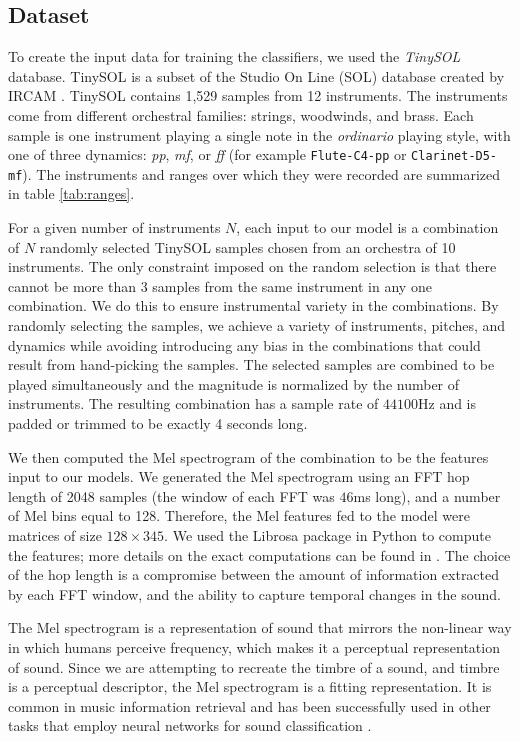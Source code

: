 \documentclass[runningheads,a4paper]{llncs}
\begin{document}
\subsection{Dataset}
\label{sec:dataset}

To create the input data for training the classifiers, we used the \emph{TinySOL} database. TinySOL is a subset of the Studio On Line (SOL) database created by IRCAM \cite{Cella2020b}. TinySOL contains 1,529 samples from 12 instruments. The instruments come from different orchestral families: strings, woodwinds, and brass. Each sample is one instrument playing a single note in the \emph{ordinario} playing style, with one of three dynamics: \textit{pp}, \textit{mf}, or \textit{ff} (for example \texttt{Flute-C4-pp} or \texttt{Clarinet-D5-mf}). The instruments and ranges over which they were recorded are summarized in table \ref{tab:ranges}.

For a given number of instruments $N$, each input to our model is a combination of $N$ randomly selected TinySOL samples chosen from an orchestra of 10 instruments. The only constraint imposed on the random selection is that there cannot be more than 3 samples from the same instrument in any one combination. We do this to ensure instrumental variety in the combinations. By randomly selecting the samples, we achieve a variety of instruments, pitches, and dynamics while avoiding introducing any bias in the combinations that could result from hand-picking the samples. The selected samples are combined to be played simultaneously and the magnitude is normalized by the number of instruments. The resulting combination has a sample rate of $44100$Hz and is padded or trimmed to be exactly 4 seconds long.

We then computed the Mel spectrogram of the combination to be the features input to our models. We generated the Mel spectrogram using an FFT hop length of 2048 samples (the window of each FFT was $46$ms long), and a number of Mel bins equal to 128. Therefore, the Mel features fed to the model were matrices of size $128\times 345$. We used the Librosa package in Python to compute the features; more details on the exact computations can be found in \cite{mcfee15}. The choice of the hop length is a compromise between the amount of information extracted by each FFT window, and the ability to capture temporal changes in the sound.

The Mel spectrogram is a representation of sound that mirrors the non-linear way in which humans perceive frequency, which makes it a perceptual representation of sound. Since we are attempting to recreate the timbre of a sound, and timbre is a perceptual descriptor, the Mel spectrogram is a fitting representation. It is common in music information retrieval \cite{McKinney2003} and has been successfully used in other tasks that employ neural networks for sound classification \cite{Salamon17}.
\end{document}

